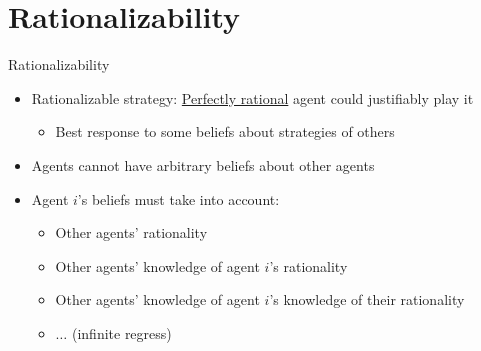 \documentclass[11pt,aspectratio=169,handout]{beamer}
\begin{document}
 \section{Rationalizability} 
  \begin{frame}{Rationalizability}
   \begin{itemize}[<+->]
   \setlength{\itemsep}{1.1em}
    \item \alert{Rationalizable} strategy: \underline{Perfectly rational} agent could justifiably play it
    \begin{itemize}
     \item Best response to some beliefs about strategies of others
    \end{itemize}
    \item Agents cannot have arbitrary beliefs about other agents
    \item Agent $i$'s beliefs must take into account:
    \begin{itemize}
     \setlength{\itemsep}{1.1em}
     \item Other agents' rationality
     \item Other agents' knowledge of agent $i$'s rationality
     \item Other agents' knowledge of agent $i$'s knowledge of their rationality
     \item $\dots$ (infinite regress)
    \end{itemize}
   \end{itemize}
  \end{frame}
  
\end{document}
